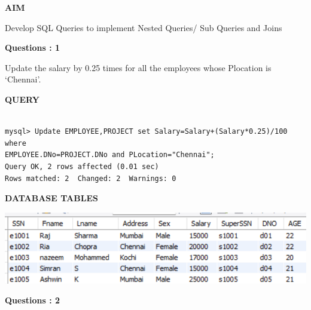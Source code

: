 \documentclass[a4paper,12pt]{report}
\begin{document}
	\begin{flushleft}
		\textbf{AIM }
	\end{flushleft} 
	   Develop SQL Queries to implement Nested Queries/ Sub Queries and Joins

\begin{flushleft}
    \textbf{Questions : 1}
\end{flushleft}
Update the salary by 0.25 times for all the employees whose Plocation is ‘Chennai’.
	\begin{flushleft}
		\textbf{QUERY }
	\end{flushleft}
 \begin{verbatim}
 
mysql> Update EMPLOYEE,PROJECT set Salary=Salary+(Salary*0.25)/100 where 
EMPLOYEE.DNo=PROJECT.DNo and PLocation="Chennai";
Query OK, 2 rows affected (0.01 sec)
Rows matched: 2  Changed: 2  Warnings: 0
\end{verbatim}
\begin{flushleft}
		\textbf{DATABASE TABLES} 
\end{flushleft} 

\includegraphics[scale=0.5]{NQ1.png}
\begin{flushleft}
    \textbf{Questions : 2}
\end{flushleft}
\end{document}
